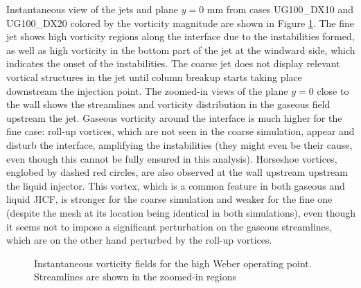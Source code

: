 
Instantaneous view of the jets and plane $y = 0$ mm from cases UG100\_DX10 and UG100\_DX20 colored by the vorticity magnitude are shown in Figure \ref{fig:JICF_instabilities_vorticity}. The fine jet shows high vorticity regions along the interface due to the instabilities formed, as well as high vorticity in the bottom part of the jet at the windward side, which indicates the onset of the instabilities. The coarse jet does not display relevant vortical structures in the jet until column breakup starts taking place downstream the injection point. The zoomed-in views of the plane $y = 0$ close to the wall shows the streamlines and vorticity distribution in the gaseous field upstream the jet. Gaseous vorticity around the interface is much higher for the fine case: roll-up vortices, which are not seen in the coarse simulation, appear and disturb the interface, amplifying the instabilities (they might even be their cause, even though this cannot be fully ensured in this analysis). Horseshoe vortices, englobed by dashed red circles, are also observed at the wall upstream upstream the liquid injector. This vortex, which is a common feature in both gaseous  and liquid  JICF, is stronger for the coarse simulation and weaker for the fine one (despite the mesh at its location being identical in both simulations), even though it seems not to impose a significant perturbation on the gaseous streamlines, which are on the other hand perturbed by the roll-up vortices.


\begin{figure}[ht]
\flushleft
{}
\caption[Instantaneous vorticity fields for the high Weber operating point.]{Instantaneous vorticity fields for the high Weber operating point. Streamlines are shown in the zoomed-in regions}
\label{fig:JICF_instabilities_vorticity}
\end{figure}

